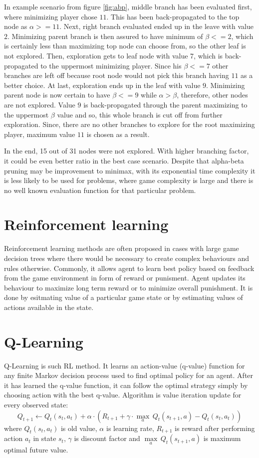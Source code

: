 In example scenario from figure \ref{fig:abp}, middle branch has been evaluated
first, where minimizing player chose $11$. This has been back-propagated
to the top node as $\alpha{>=}11$. Next, right branch evaluated ended up in the
leave with value $2$. Minimizing parent branch is then assured to have minimum
of $\beta{<=}2$, which is certainly less than maximizing top node can choose
from, so the other leaf is not explored. Then, exploration gets to leaf node
with value 7, which is back-propagated to the uppermost minimizing player.
Since his $\beta{<=}7$ other branches are left off because root node would not
pick this branch having $11$ as a better choice. At last, exploration ends up
in the leaf with value $9$. Minimizing parent node is now certain to have
$\beta{<=}9$ while $\alpha{>}\beta$, therefore, other nodes are not explored.
Value $9$ is back-propagated through the parent maximizing to the uppermost
$\beta$ value and so, this whole branch is cut off from further exploration.
Since, there are no other branches to explore for the root maximizing player,
maximum value $11$ is chosen as a result.

In the end, 15 out of 31 nodes were not explored. With higher branching factor,
it could be even better ratio in the best case scenario. Despite that
alpha-beta pruning may be improvement to minimax, with its exponential
time complexity it is less likely to be used for problems, where game
complexity is large and there is no well known evaluation function for that
particular problem.


\section{Reinforcement learning}
Reinforcement learning methods are often proposed in cases with large game
decision trees where there would be necessary to create complex behaviours and
rules otherwise.
Commonly, it allows agent to learn best policy based on feedback from the game
environment in form of reward or punisment. Agent updates its behaviour to
maximize long term reward or to minimize overall punishment. It is done by
esitmating value of a particular game state or by estimating values of actions
available in the state.


\section{Q-Learning}
Q-Learning is such RL method. It learns an action-value
(q-value) function for any finite Markov decision process used to find
optimal policy for an agent. After it has learned the q-value function,
it can follow the optimal strategy simply by choosing action with the best
q-value.  Algorithm is value iteration update for every observed
state\cite{rlsurvey}:
\begin{equation}
Q_{t+1} \leftarrow Q_t(s_t, a_t) + \alpha \cdot (
    R_{t+1} + \gamma\cdot {\max_a}\,Q_t(s_{t+1}, a) - Q_t(s_t, a_t)
)
\end{equation}
where $Q_t(s_t, a_t)$ is old value, $\alpha$ is learning rate, $R_{t+1}$ is
reward after performing action $a_t$ in state $s_t$, $\gamma$ is discount
factor and $\underset{a}{\max}\,Q_t(s_{t+1}, a)$ is maximum optimal future
value.

